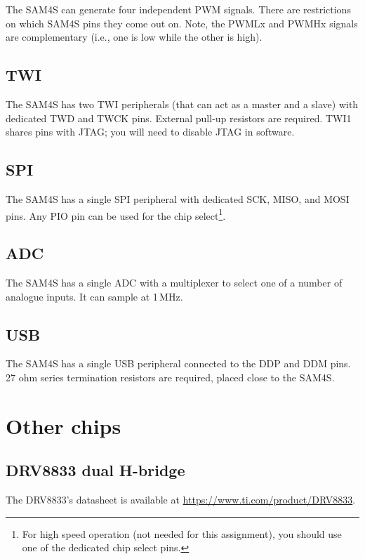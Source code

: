 The SAM4S can generate four independent PWM signals. There are
restrictions on which SAM4S pins they come out on. Note, the PWMLx and
PWMHx signals are complementary (i.e., one is low while the other is
high).

\subsection{TWI}\label{twi}

The SAM4S has two TWI peripherals (that can act as a master and
a slave) with dedicated TWD and TWCK pins. External pull-up resistors
are required.  TWI1 shares pins with JTAG; you will need to disable
JTAG in software.

\subsection{SPI}\label{spi}

The SAM4S has a single SPI peripheral with dedicated SCK, MISO, and
MOSI pins. Any PIO pin can be used for the chip select\footnote{For
  high speed operation (not needed for this assignment), you should
  use one of the dedicated chip select pins.}.

\subsection{ADC}\label{adc}

The SAM4S has a single ADC with a multiplexer to select one of a
number of analogue inputs.  It can sample at 1\,MHz.

\subsection{USB}\label{usb}

The SAM4S has a single USB peripheral connected to the DDP and DDM
pins. 27 ohm series termination resistors are required, placed close to
the SAM4S.

\section{Other chips}\label{other-chips}

\subsection{DRV8833 dual H-bridge}\label{drv8833-dual-h-bridge}

The DRV8833's datasheet is available at
\url{https://www.ti.com/product/DRV8833}.

